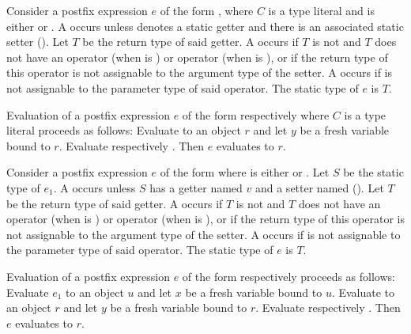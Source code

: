 \documentclass[makeidx]{article}
\begin{document}
\EndCase

\LMHash{}%
Consider a postfix expression $e$ of the form ,
where $C$ is a type literal and \op{} is either \lit{++} or \lit{-{}-}.
A  occurs
unless  denotes a static getter
and there is an associated static setter 
().
Let $T$ be the return type of said getter.
A  occurs if $T$ is not \DYNAMIC{}
and $T$ does not have an operator \lit{+} (when \op{} is \lit{++})
or operator \lit{-} (when \op{} is \lit{-{}-}),
or if the return type of this operator is not assignable to
the argument type of the setter.
A  occurs if  is not assignable to
the parameter type of said operator.
The static type of $e$ is $T$.

\LMHash{}%
Evaluation of a postfix expression $e$
of the form  respectively 
where $C$ is a type literal proceeds as follows:
Evaluate  to an object $r$
and let $y$ be a fresh variable bound to $r$.
Evaluate  respectively .
Then $e$ evaluates to $r$.
\EndCase

\LMHash{}%
Consider a postfix expression $e$ of the form 
where \op{} is either \lit{++} or \lit{-{}-}.
Let $S$ be the static type of $e_1$.
A  occurs unless $S$ has
a getter named $v$ and a setter named 
().
Let $T$ be the return type of said getter.
A  occurs if $T$ is not \DYNAMIC{}
and $T$ does not have an operator \lit{+} (when \op{} is \lit{++})
or operator \lit{-} (when \op{} is \lit{-{}-}),
or if the return type of this operator is not assignable to
the argument type of the setter.
A  occurs if  is not assignable to
the parameter type of said operator.
The static type of $e$ is $T$.

\LMHash{}%
Evaluation of a postfix expression $e$
of the form  respectively 
proceeds as follows:
Evaluate $e_1$ to an object $u$ and let $x$ be a fresh variable bound to $u$.
Evaluate  to an object $r$
and let $y$ be a fresh variable bound to $r$.
Evaluate  respectively .
Then $e$ evaluates to $r$.
\EndCase
\end{document}
